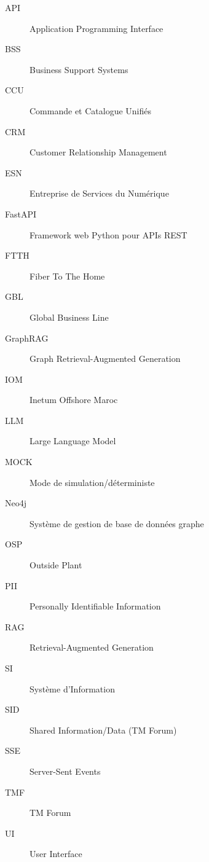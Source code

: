 \listofsigle

\begin{description}
\item[API] Application Programming Interface
\item[BSS] Business Support Systems
\item[CCU] Commande et Catalogue Unifiés
\item[CRM] Customer Relationship Management
\item[ESN] Entreprise de Services du Numérique
\item[FastAPI] Framework web Python pour APIs REST
\item[FTTH] Fiber To The Home
\item[GBL] Global Business Line
\item[GraphRAG] Graph Retrieval-Augmented Generation
\item[IOM] Inetum Offshore Maroc
\item[LLM] Large Language Model
\item[MOCK] Mode de simulation/déterministe
\item[Neo4j] Système de gestion de base de données graphe
\item[OSP] Outside Plant
\item[PII] Personally Identifiable Information
\item[RAG] Retrieval-Augmented Generation
\item[SI] Système d'Information
\item[SID] Shared Information/Data (TM Forum)
\item[SSE] Server-Sent Events
\item[TMF] TM Forum
\item[UI] User Interface
\end{description}
